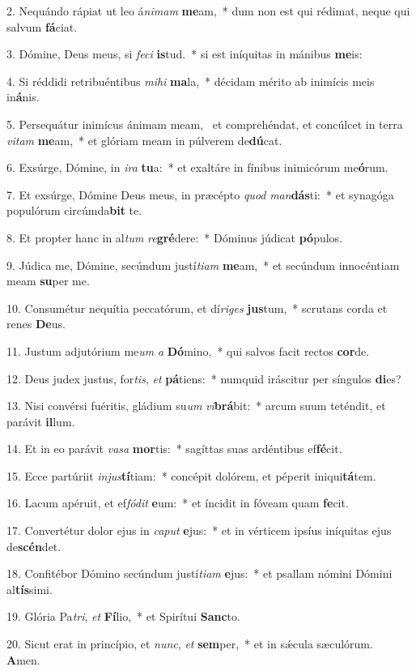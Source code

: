 2. Nequándo rápiat ut leo á\textit{ni}\textit{mam} \textbf{me}am,~*  dum non est qui rédimat, neque qui salvum \textbf{fá}ciat.\

3. Dómine, Deus meus, si \textit{fe}\textit{ci} \textbf{is}tud.~*  si est iníquitas in mánibus \textbf{me}is:\

4. Si réddidi retribuéntibus \textit{mi}\textit{hi} \textbf{ma}la,~*  décidam mérito ab inimícis meis in\textbf{á}nis.\

5. Persequátur inimícus ánimam meam, \dag\  et comprehéndat, et concúlcet in terra \textit{vi}\textit{tam} \textbf{me}am,~*  et glóriam meam in púlverem de\textbf{dú}cat.\

6. Exsúrge, Dómine, in \textit{i}\textit{ra} \textbf{tu}a:~*  et exaltáre in fínibus inimicórum me\textbf{ó}rum.\

7. Et exsúrge, Dómine Deus meus, in præcépto \textit{quod} \textit{man}\textbf{dás}ti:~*  et synagóga populórum circúmda\textbf{bit} te.\

8. Et propter hanc in al\textit{tum} \textit{re}\textbf{gré}dere:~*  Dóminus júdicat \textbf{pó}pulos.\

9. Júdica me, Dómine, secúndum justí\textit{ti}\textit{am} \textbf{me}am,~*  et secúndum innocéntiam meam \textbf{su}per me.\

10. Consumétur nequítia peccatórum, et dí\textit{ri}\textit{ges} \textbf{jus}tum,~*  scrutans corda et renes \textbf{De}us.\

11. Justum adjutórium me\textit{um} \textit{a} \textbf{Dó}mino,~*  qui salvos facit rectos \textbf{cor}de.\

12. Deus judex justus, for\textit{tis}, \textit{et} \textbf{pá}tiens:~*  numquid iráscitur per síngulos \textbf{di}es?\

13. Nisi convérsi fuéritis, gládium su\textit{um} \textit{vi}\textbf{brá}bit:~*  arcum suum teténdit, et parávit \textbf{il}lum.\

14. Et in eo parávit \textit{va}\textit{sa} \textbf{mor}tis:~*  sagíttas suas ardéntibus ef\textbf{fé}cit.\

15. Ecce partúriit \textit{in}\textit{jus}\textbf{tí}tiam:~*  concépit dolórem, et péperit iniqui\textbf{tá}tem.\

16. Lacum apéruit, et ef\textit{fó}\textit{dit} \textbf{e}um:~*  et íncidit in fóveam quam \textbf{fe}cit.\

17. Convertétur dolor ejus in \textit{ca}\textit{put} \textbf{e}jus:~*  et in vérticem ipsíus iníquitas ejus de\textbf{scén}det.\

18. Confitébor Dómino secúndum justí\textit{ti}\textit{am} \textbf{e}jus:~*  et psallam nómini Dómini al\textbf{tís}simi.\

19. Glória Pa\textit{tri}, \textit{et} \textbf{Fí}lio,~*  et Spirítui \textbf{Sanc}to.\

20. Sicut erat in princípio, et \textit{nunc}, \textit{et} \textbf{sem}per,~*  et in sǽcula sæculórum. \textbf{A}men.\

